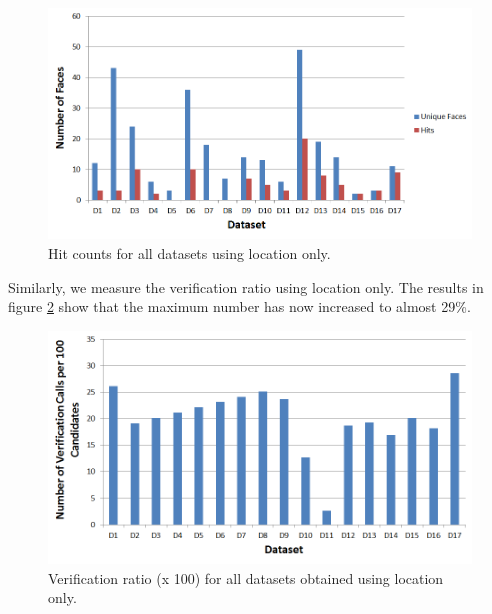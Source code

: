\begin{figure}[ht]
\centering
\includegraphics[width=\textwidth]{media/chapter5/axis/loc-unique-faces-hits-all-datasets.png}
\caption{Hit counts for all datasets using location only.}
\label{fig:exp-loc-hits}
\end{figure}

Similarly, we measure the verification ratio using location only. The results in figure \ref{fig:exp-loc-verification-ratio} show that the maximum number has now increased to almost 29\%. 

\begin{figure}[h!]
\centering
\includegraphics[width=\textwidth]{media/chapter5/axis/loc-verification-ratio-all-datasets.png}
\caption{Verification ratio (x 100) for all datasets obtained using location only.}
\label{fig:exp-loc-verification-ratio}
\end{figure}


